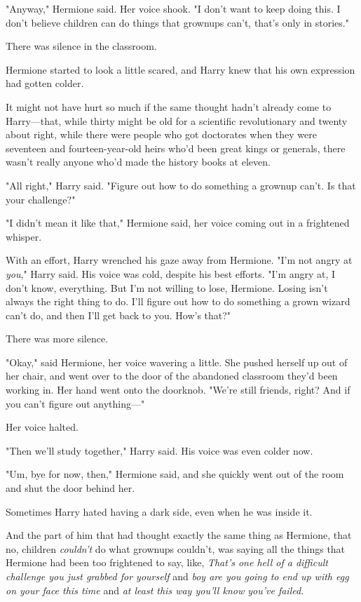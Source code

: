 "Anyway," Hermione said. Her voice shook. "I don't want to keep doing this. I
don't believe children can do things that grownups can't, that's only in
stories."

There was silence in the classroom.

Hermione started to look a little scared, and Harry knew that his own
expression had gotten colder.

It might not have hurt so much if the same thought hadn't already come to
Harry---that, while thirty might be old for a scientific revolutionary and
twenty about right, while there were people who got doctorates when they were
seventeen and fourteen-year-old heirs who'd been great kings or generals, there
wasn't really anyone who'd made the history books at eleven.

"All right," Harry said. "Figure out how to do something a grownup can't. Is
that your challenge?"

"I didn't mean it like that," Hermione said, her voice coming out in a
frightened whisper.

With an effort, Harry wrenched his gaze away from Hermione. "I'm not angry at
\emph{you}," Harry said. His voice was cold, despite his best efforts. "I'm
angry at, I don't know, everything. But I'm not willing to lose, Hermione.
Losing isn't always the right thing to do. I'll figure out how to do something
a grown wizard can't do, and then I'll get back to you. How's that?"

There was more silence.

"Okay," said Hermione, her voice wavering a little. She pushed herself up out
of her chair, and went over to the door of the abandoned classroom they'd been
working in. Her hand went onto the doorknob. "We're still friends, right? And
if you can't figure out anything\mbox{---}"

Her voice halted.

"Then we'll study together," Harry said. His voice was even colder now.

"Um, bye for now, then," Hermione said, and she quickly went out of the room
and shut the door behind her.

Sometimes Harry hated having a dark side, even when he was inside it.

And the part of him that had thought exactly the same thing as Hermione, that
no, children \emph{couldn't} do what grownups couldn't, was saying all the
things that Hermione had been too frightened to say, like, \emph{That's one
hell of a difficult challenge you just grabbed for yourself} and \emph{boy are
you going to end up with egg on your face this time} and \emph{at least this
way you'll know you've failed.}

